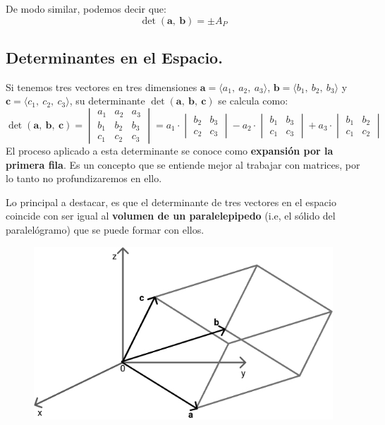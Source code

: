 \documentclass[12pt]{article}
\begin{document}
De modo similar, podemos decir que:
\[
  \det(\mathbf{a}, \ \mathbf{b}) = \pm A_{P}
\]

\subsection{Determinantes en el Espacio.}

Si tenemos tres vectores en tres dimensiones $\mathbf{a} = \langle a_{1}, \ a_{2}, \ a_{3} \rangle$, $\mathbf{b} = \langle b_{1}, \ b_{2}, \ b_{3} \rangle$ y $\mathbf{c} = \langle c_{1}, \ c_{2}, \ c_{3} \rangle$, su determinante $\det(\mathbf{a}, \ \mathbf{b}, \ \mathbf{c})$ se calcula como:
\[
\det(\mathbf{a}, \ \mathbf{b}, \ \mathbf{c}) =
\begin{vmatrix}
a_{1} & a_{2} & a_{3} \\
b_{1} & b_{2} & b_{3} \\
c_{1} & c_{2} & c_{3} 
\end{vmatrix} =
a_{1}
\cdot
\begin{vmatrix}
b_{2} & b_{3} \\
c_{2} & c_{3}
\end{vmatrix}
-
a_{2}
\cdot
\begin{vmatrix}
b_{1} & b_{3} \\
c_{1} & c_{3}
\end{vmatrix}
+
a_{3}
\cdot
\begin{vmatrix}
b_{1} & b_{2} \\
c_{1} & c_{2}
\end{vmatrix}
\]
El proceso aplicado a esta determinante se conoce como \textbf{expansión por la primera fila}. Es un concepto que se entiende mejor al trabajar con matrices, por lo tanto no profundizaremos en ello.

Lo principal a destacar, es que el determinante de tres vectores en el espacio coincide con ser igual al \textbf{volumen de un paralelepipedo} (i.e, el sólido del paralelógramo) que se puede formar con ellos.

\begin{figure}[hbt!]
\centering
\includegraphics[scale=0.4]{img/det-vol-parallelel-1.jpg}
\end{figure}
\end{document}
